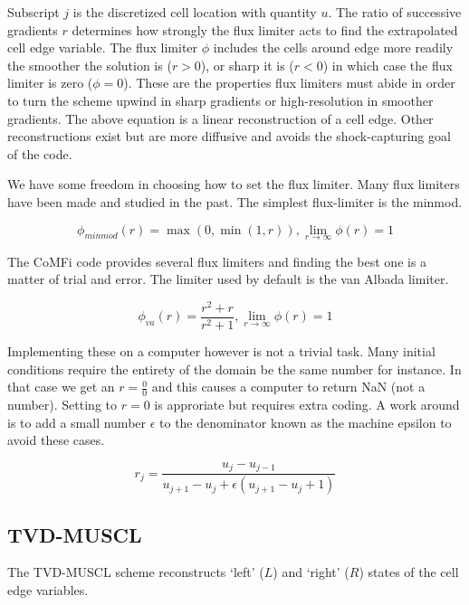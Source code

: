 \documentclass[12pt,upcase]{umlthesis}
\begin{document}
Subscript $j$ is the discretized cell location with quantity $u$. The ratio of successive gradients $r$ determines how strongly the flux limiter acts to find the extrapolated cell edge variable. The flux limiter $\phi$ includes the cells around edge more readily the smoother the solution is ($r>0$), or sharp it is ($r<0$) in which case the flux limiter is zero ($\phi=0$). These are the properties flux limiters must abide in order to turn the scheme upwind in sharp gradients or high-resolution in smoother gradients. The above equation is a linear reconstruction of a cell edge. Other reconstructions exist but are more diffusive and avoids the shock-capturing goal of the code.

We have some freedom in choosing how to set the flux limiter. Many flux limiters have been made and studied in the past. The simplest flux-limiter is the minmod.

\begin{equation}\label{eq:minmod}
	\phi_{minmod}(r) = \max(0, \min(1, r)), \lim_{r \to \infty} \phi(r) = 1
\end{equation}

The CoMFi code provides several flux limiters and finding the best one is a matter of trial and error. The limiter used by default is the van Albada limiter.

\begin{equation}\label{eq:vanalbada}
	\phi_{va}(r) = \frac{r^2 + r}{r^2 + 1}, \lim_{r \to \infty} \phi(r) = 1
\end{equation}

Implementing these on a computer however is not a trivial task. Many initial conditions require the entirety of the domain be the same number for instance. In that case we get an $r = \frac{0}{0}$ and this causes a computer to return NaN (not a number). Setting to $r=0$ is approriate but requires extra coding. A work around is to add a small number $\epsilon$ to the denominator known as the machine epsilon to avoid these cases.

\begin{equation}
	r_j = \frac{u_j - u_{j-1}}{u_{j+1} - u_j + \epsilon(u_{j+1} - u_j + 1)}
\end{equation}

\subsection{TVD-MUSCL}\label{sec:tvd-muscl}

The TVD-MUSCL scheme reconstructs `left' ($L$) and `right' ($R$) states of the cell edge variables. 
\end{document}
